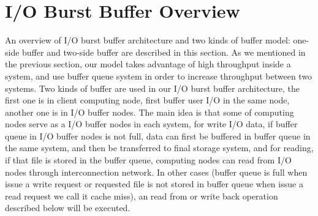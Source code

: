 \section{I/O Burst Buffer Overview}
\label{sec:burst_buffer}


An overview of I/O burst buffer architecture and two kinds of buffer model: one-side buffer and two-side buffer are described in this section.
As we mentioned in the previous section, our model takes advantage of high throughput inside a system, and use buffer queue system in order to increase throughput between two systems.
Two kinds of buffer are used in our I/O burst buffer architecture, the first one is in client computing node, first buffer user I/O in the same node, another one is in I/O buffer nodes.
The main idea is that some of computing nodes serve as a I/O buffer nodes in each system, for write I/O data, if buffer queue in I/O buffer nodes is not full, data can first be buffered in buffer queue in the same system, and then be transferred to final storage system, and for reading, if that file is stored in the buffer queue, computing nodes can read from I/O nodes through interconnection network.
In other cases (buffer queue is full when issue a write request or requested file is not stored in buffer queue when issue a read request we call it cache miss), an read from or write back operation described below will be executed. 





